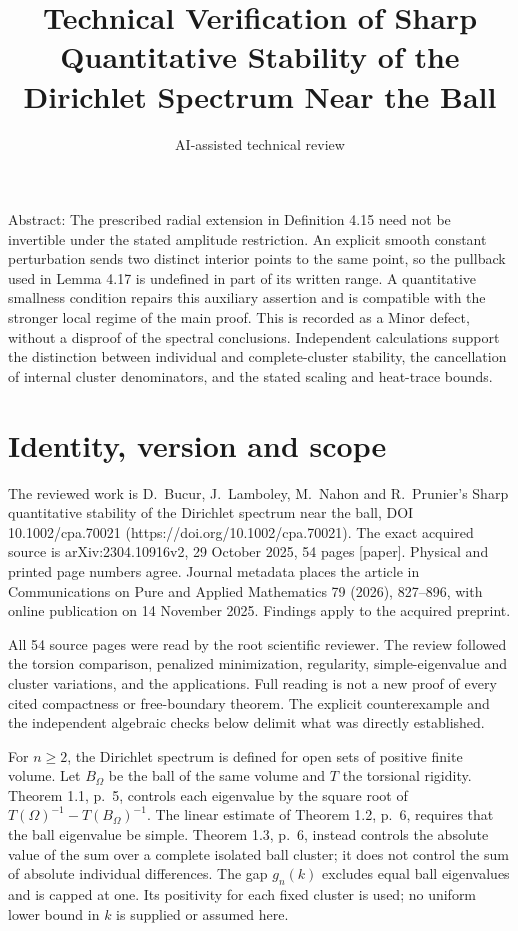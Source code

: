 \documentclass[10pt]{article}
\title{Technical Verification of Sharp Quantitative Stability of the Dirichlet Spectrum Near the Ball}
\author{AI-assisted technical review}
\date{}
\begin{document}
\maketitle
Abstract: The prescribed radial extension in Definition 4.15 need not be invertible under the stated amplitude restriction. An explicit smooth constant perturbation sends two distinct interior points to the same point, so the pullback used in Lemma 4.17 is undefined in part of its written range. A quantitative smallness condition repairs this auxiliary assertion and is compatible with the stronger local regime of the main proof. This is recorded as a Minor defect, without a disproof of the spectral conclusions. Independent calculations support the distinction between individual and complete-cluster stability, the cancellation of internal cluster denominators, and the stated scaling and heat-trace bounds.\par
\section*{Identity, version and scope}
The reviewed work is D. Bucur, J. Lamboley, M. Nahon and R. Prunier’s Sharp quantitative stability of the Dirichlet spectrum near the ball, DOI 10.1002/cpa.70021 (https://doi.org/10.1002/cpa.70021). The exact acquired source is arXiv:2304.10916v2, 29 October 2025, 54 pages [paper]. Physical and printed page numbers agree. Journal metadata places the article in Communications on Pure and Applied Mathematics 79 (2026), 827–896, with online publication on 14 November 2025. Findings apply to the acquired preprint.\par
All 54 source pages were read by the root scientific reviewer. The review followed the torsion comparison, penalized minimization, regularity, simple-eigenvalue and cluster variations, and the applications. Full reading is not a new proof of every cited compactness or free-boundary theorem. The explicit counterexample and the independent algebraic checks below delimit what was directly established.\par
For \(n\geq2\), the Dirichlet spectrum is defined for open sets of positive finite volume. Let \(B_\Omega\) be the ball of the same volume and \(T\) the torsional rigidity. Theorem 1.1, p. 5, controls each eigenvalue by the square root of \(T(\Omega)^{-1}-T(B_\Omega)^{-1}\). The linear estimate of Theorem 1.2, p. 6, requires that the ball eigenvalue be simple. Theorem 1.3, p. 6, instead controls the absolute value of the sum over a complete isolated ball cluster; it does not control the sum of absolute individual differences. The gap \(g_n(k)\) excludes equal ball eigenvalues and is capped at one. Its positivity for each fixed cluster is used; no uniform lower bound in \(k\) is supplied or assumed here.\par
\end{document}
